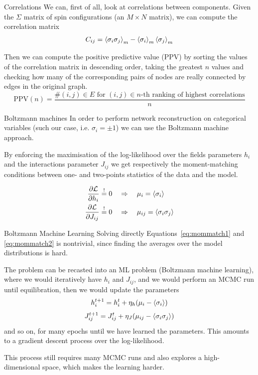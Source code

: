 \documentclass[handout]{beamer}
\newcommand{\reqeq}{\overset{!}{=}}
\begin{document}
\begin{frame}{Correlations}
    We can, first of all, look at correlations between components. Given the
    $\Sigma$ matrix of spin configurations (an $M \times N$ matrix), we can
    compute the \alert{correlation matrix}
    \begin{equation}
        C_{ij} = \expval{\sigma_i \sigma_j}_m - \expval{\sigma_i}_m
        \expval{\sigma_j}_m
    \end{equation}

    Then we can compute the \alert{positive predictive value} (PPV) by sorting
    the values of the correlation matrix in descending order, taking the
    greatest $n$ values and checking how many of the corresponding pairs of
    nodes are really connected by edges in the original graph.
    \begin{equation}
        \text{PPV}(n) = \frac{\#(i, j) \in E\text{ for }(i, j) \in n\text{-th
        ranking of highest correlations}}{n}
    \end{equation}
\end{frame}

\begin{frame}{Boltzmann machines}
    In order to perform network reconstruction on categorical variables (such
    our case, i.e. $\sigma_i=\pm 1$) we can use the \alert{Boltzmann machine}
    approach.

    By enforcing the maximisation of the log-likelihood over the \alert{fields}
    parameters $h_i$ and the {interactions} parameter $J_{ij}$ we get
    respectively the \alert{moment-matching} conditions between one- and
    two-points statistics of the data and the model. \cite[89]{spddm}

    \begin{align}
        \pdv{\mathcal{L}}{h_i} \reqeq 0 \quad &\Rightarrow \quad \mu_i =
        \expval{\sigma_i} \label{eq:mommatch1}\\
        \pdv{\mathcal{L}}{J_{ij}} \reqeq 0 \quad &\Rightarrow \quad \mu_{ij} =
        \expval{\sigma_i\sigma_j} \label{eq:mommatch2}
    \end{align}
\end{frame}

\begin{frame}{Boltzmann Machine Learning}
    Solving directly Equations~\ref{eq:mommatch1} and \ref{eq:mommatch2} is
    nontrivial, since finding the averages over the model distributions is hard.

    The problem can be recasted into an ML problem (\alert{Boltzmann machine
    learning}),
    where we would iteratively have $h_i$ and $J_{ij}$, and we would perform an
    MCMC run until equilibration, then we would update the parameters
    $$
    h_i^{t+1} = h_i^t + \eta_h (\mu_i - \expval{\sigma_i})
    $$
    $$
    J_{ij}^{t+1} = J_{ij}^t + \eta_J (\mu_{ij} - \expval{\sigma_i\sigma_j})
    $$
    and so on, for many epochs until we have learned the parameters.
    This amounts to a gradient descent process over the log-likelihood.

    This process still requires many MCMC runs and also explores a
    high-dimensional space, which makes the learning harder.
\end{frame}
\end{document}
